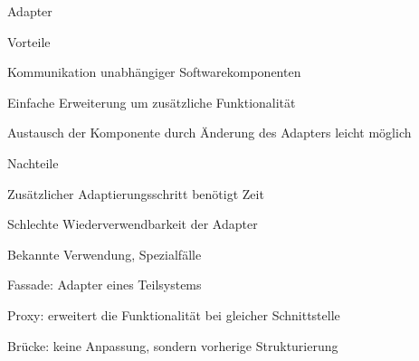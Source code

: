 \documentclass[a4paper]{article}
\begin{document}
\begin{multicols}{3}
  Adapter
  \begin{itemize*}
    \item Vorteile
    \begin{itemize*}
      \item Kommunikation unabhängiger Softwarekomponenten
      \item Einfache Erweiterung um zusätzliche Funktionalität
      \item Austausch der Komponente durch Änderung des Adapters leicht möglich
    \end{itemize*}
    \item Nachteile
    \begin{itemize*}
      \item Zusätzlicher Adaptierungsschritt benötigt Zeit
      \item Schlechte Wiederverwendbarkeit der Adapter
    \end{itemize*}
    \item Bekannte Verwendung, Spezialfälle
    \begin{itemize*}
      \item Fassade: Adapter eines Teilsystems
      \item Proxy: erweitert die Funktionalität bei gleicher Schnittstelle
      \item Brücke: keine Anpassung, sondern vorherige Strukturierung
    \end{itemize*}
  \end{itemize*}


\end{multicols}
\end{document}
